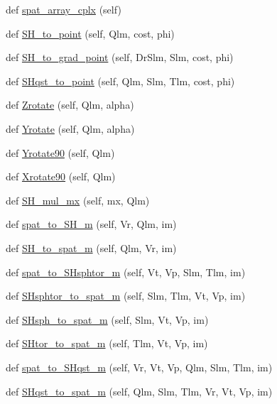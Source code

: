 \begin{DoxyCompactItemize}
\item 
def \hyperlink{classshtns_1_1sht_a13d82e6530fc1290e629a7abeb26e726}{spat\+\_\+array\+\_\+cplx} (self)
\item 
def \hyperlink{classshtns_1_1sht_ab354097d427e6b5824f5d5b8c07514a4}{S\+H\+\_\+to\+\_\+point} (self, Qlm, cost, phi)
\item 
def \hyperlink{classshtns_1_1sht_ac26750ee39a1f07f6c3a6af749643607}{S\+H\+\_\+to\+\_\+grad\+\_\+point} (self, Dr\+Slm, Slm, cost, phi)
\item 
def \hyperlink{classshtns_1_1sht_ad3c5e57c96c25f610ceecd7d6847f301}{S\+Hqst\+\_\+to\+\_\+point} (self, Qlm, Slm, Tlm, cost, phi)
\item 
def \hyperlink{classshtns_1_1sht_a9556019d5b506d700b1adcc45fde815a}{Zrotate} (self, Qlm, alpha)
\item 
def \hyperlink{classshtns_1_1sht_a49b1205ab899052a2e9df768be7715f5}{Yrotate} (self, Qlm, alpha)
\item 
def \hyperlink{classshtns_1_1sht_ac87b604c08651351af2e436c9ffa7f31}{Yrotate90} (self, Qlm)
\item 
def \hyperlink{classshtns_1_1sht_a2a1ece631f4b32508c32d96212dc0008}{Xrotate90} (self, Qlm)
\item 
def \hyperlink{classshtns_1_1sht_ad9c878a0f727631327f6df30a78f695a}{S\+H\+\_\+mul\+\_\+mx} (self, mx, Qlm)
\item 
def \hyperlink{classshtns_1_1sht_a546db16f8fe3fd74d8d560a54873181b}{spat\+\_\+to\+\_\+\+S\+H\+\_\+m} (self, Vr, Qlm, im)
\item 
def \hyperlink{classshtns_1_1sht_ad288b2900df239ff594f96cf6bfe7685}{S\+H\+\_\+to\+\_\+spat\+\_\+m} (self, Qlm, Vr, im)
\item 
def \hyperlink{classshtns_1_1sht_a0b738f83791e42a6ef6a8532a8bbb585}{spat\+\_\+to\+\_\+\+S\+Hsphtor\+\_\+m} (self, Vt, Vp, Slm, Tlm, im)
\item 
def \hyperlink{classshtns_1_1sht_aa33ff4ce5c6bd4081f662f7656eca043}{S\+Hsphtor\+\_\+to\+\_\+spat\+\_\+m} (self, Slm, Tlm, Vt, Vp, im)
\item 
def \hyperlink{classshtns_1_1sht_a7f8d89bb110778b5efb073fa2c8d80fa}{S\+Hsph\+\_\+to\+\_\+spat\+\_\+m} (self, Slm, Vt, Vp, im)
\item 
def \hyperlink{classshtns_1_1sht_a46abec1d2c7d34704818cb2b30fb49b5}{S\+Htor\+\_\+to\+\_\+spat\+\_\+m} (self, Tlm, Vt, Vp, im)
\item 
def \hyperlink{classshtns_1_1sht_a4cb91c6fdbd221df74582f11020e6a98}{spat\+\_\+to\+\_\+\+S\+Hqst\+\_\+m} (self, Vr, Vt, Vp, Qlm, Slm, Tlm, im)
\item 
def \hyperlink{classshtns_1_1sht_a027a1c9a5ccc8c503e3a1e2f215ccfc7}{S\+Hqst\+\_\+to\+\_\+spat\+\_\+m} (self, Qlm, Slm, Tlm, Vr, Vt, Vp, im)
\end{DoxyCompactItemize}
